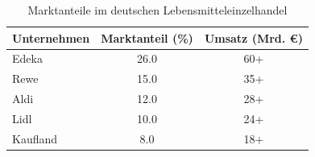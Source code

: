 \begin{otherlanguage}{ngerman}
\begin{table}[h]
\centering
\begin{tabular}{lcc}
\toprule
\textbf{Unternehmen} & \textbf{Marktanteil (\%)} & \textbf{Umsatz (Mrd. €)} \\
\midrule
Edeka & 26.0 & 60+ \\
Rewe & 15.0 & 35+ \\
Aldi & 12.0 & 28+ \\
Lidl & 10.0 & 24+ \\
Kaufland & 8.0 & 18+ \\
\bottomrule
\end{tabular}
\caption{Marktanteile im deutschen Lebensmitteleinzelhandel}
\end{table}
\end{otherlanguage}

